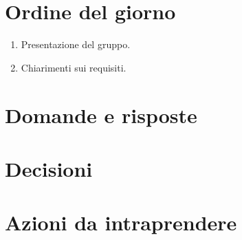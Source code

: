 


\section{Ordine del giorno}
\begin{enumerate}
  \item Presentazione del gruppo.
  \item Chiarimenti sui requisiti.
\end{enumerate}

\section{Domande e risposte}

\section{Decisioni}
\begin{decisioni}
\end{decisioni}

\section{Azioni da intraprendere}
\begin{azioni}
\end{azioni}


